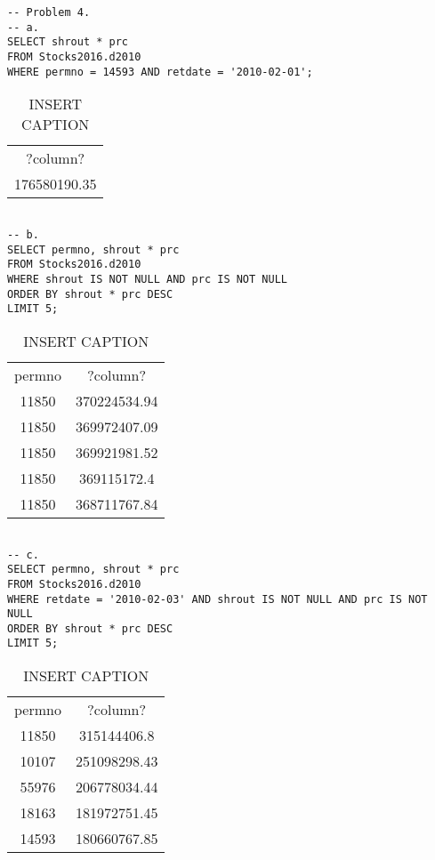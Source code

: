 \documentclass[12 pt]{article}
\begin{document}
\begin{flushleft}
\begin{verbatim}
-- Problem 4.
-- a. 
SELECT shrout * prc
FROM Stocks2016.d2010
WHERE permno = 14593 AND retdate = '2010-02-01'; 
 \end{verbatim} 
\begin{table}[h] 
\centering 
\caption{INSERT CAPTION} 
\label{my - label} 
\begin{tabular}{c } 
\\
?column?\\
176580190.35\\
\end{tabular} 
 \end{table} \begin{verbatim} 

-- b. 
SELECT permno, shrout * prc
FROM Stocks2016.d2010
WHERE shrout IS NOT NULL AND prc IS NOT NULL
ORDER BY shrout * prc DESC
LIMIT 5; 
 \end{verbatim} 
\begin{table}[h] 
\centering 
\caption{INSERT CAPTION} 
\label{my - label} 
\begin{tabular}{c c } 
\\
permno & ?column?\\
11850 & 370224534.94\\
11850 & 369972407.09\\
11850 & 369921981.52\\
11850 & 369115172.4\\
11850 & 368711767.84\\
\end{tabular} 
 \end{table} \begin{verbatim} 

-- c. 
SELECT permno, shrout * prc
FROM Stocks2016.d2010
WHERE retdate = '2010-02-03' AND shrout IS NOT NULL AND prc IS NOT NULL
ORDER BY shrout * prc DESC
LIMIT 5; 
 \end{verbatim} 
\begin{table}[h] 
\centering 
\caption{INSERT CAPTION} 
\label{my - label} 
\begin{tabular}{c c } 
\\
permno & ?column?\\
11850 & 315144406.8\\
10107 & 251098298.43\\
55976 & 206778034.44\\
18163 & 181972751.45\\
14593 & 180660767.85\\
\end{tabular} 
 \end{table} \begin{verbatim} 


\end{verbatim}
\end{flushleft}
\end{document}
